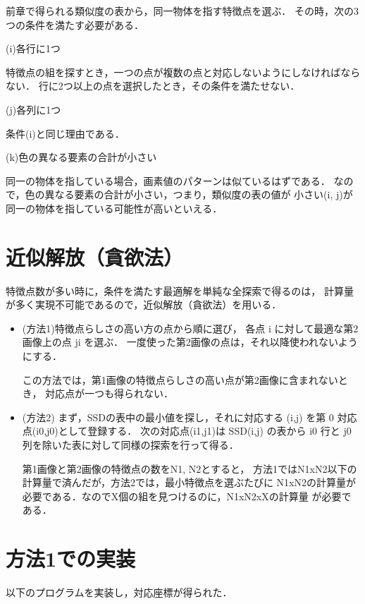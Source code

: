 \documentclass[11pt]{jarticle}
\begin{document}
前章で得られる類似度の表から，同一物体を指す特徴点を選ぶ．
その時，次の3つの条件を満たす必要がある．

(i)各行に1つ

特徴点の組を探すとき，一つの点が複数の点と対応しないようにしなければならない．
行に2つ以上の点を選択したとき，その条件を満たせない．

(j)各列に1つ

条件(i)と同じ理由である．

(k)色の異なる要素の合計が小さい

同一の物体を指している場合，画素値のパターンは似ているはずである．
なので，色の異なる要素の合計が小さい，つまり，類似度の表の値が
小さい(i, j)が同一の物体を指している可能性が高いといえる．

\section{近似解放（貪欲法）}

特徴点数が多い時に，条件を満たす最適解を単純な全探索で得るのは，
計算量が多く実現不可能であるので，近似解放（貪欲法）を用いる．

\begin{itemize}
    \item (方法1)特徴点らしさの高い方の点から順に選び， 
    各点 i に対して最適な第2画像上の点 ji を選ぶ．
    一度使った第2画像の点は，それ以降使われないようにする．

    この方法では，第1画像の特徴点らしさの高い点が第2画像に含まれないとき，
    対応点が一つも得られない．

    \item (方法2) まず，SSDの表中の最小値を探し，それに対応する (i,j)
     を第 0 対応点(i0,j0)として登録する． 次の対応点(i1,j1)は 
    SSD(i,j) の表から i0 行と j0 列を除いた表に対して同様の探索を行って得る．

    第1画像と第2画像の特徴点の数をN1, N2とすると，
    方法1ではN1xN2以下の計算量で済んだが，方法2では，最小特徴点を選ぶたびに
    N1xN2の計算量が必要である．なのでX個の組を見つけるのに，N1xN2xXの計算量
    が必要である．

  \end{itemize}

\section{方法1での実装}

以下のプログラムを実装し，対応座標が得られた．
\end{document}
